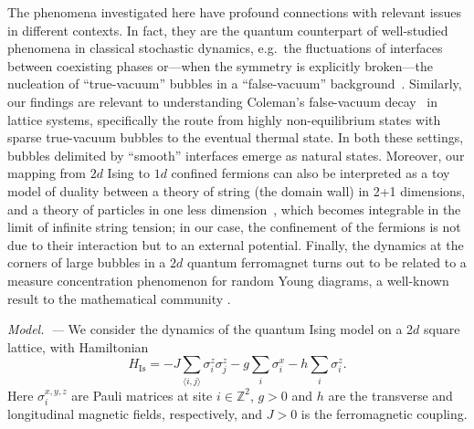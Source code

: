 \documentclass[reprint,aps,prl,superscriptaddress,english,nolongbibliography]{revtex4-2}
\begin{document}
The phenomena investigated here have profound connections with relevant issues in different contexts. In fact, they are the quantum counterpart of well-studied phenomena in classical stochastic dynamics, e.g.\ the fluctuations of interfaces between coexisting phases \cite{Krapivsky2004Dynamics,Krapivsky2012Limiting} or---when the symmetry is explicitly broken---the nucleation of ``true-vacuum'' bubbles in a ``false-vacuum'' background~\cite{bray1994theory,onuki2002phase}. Similarly, our findings are relevant to understanding Coleman's false-vacuum decay~\cite{Coleman1977False,coleman1988aspects,Rutkevich1999Decay,Lagnese2021False} in lattice systems, specifically the route from highly non-equilibrium states with sparse true-vacuum bubbles to the eventual thermal state. In both these settings, bubbles delimited by ``smooth'' interfaces emerge as natural states. Moreover, our mapping from $2d$ Ising to $1d$ confined fermions can also be interpreted as a toy model of duality between a theory of string (the domain wall) in 2+1 dimensions, and a theory of particles in one less dimension~\cite{maldacena1999large,gubser1998gauge,witten1998anti}, which becomes integrable in the limit of infinite string tension; in our case, the confinement of the fermions is not due to their interaction but to an external potential. Finally, the dynamics at the corners of large bubbles in a $2d$ quantum ferromagnet turns out to be related to a measure concentration phenomenon for random Young diagrams, a well-known result to the mathematical community \cite{Logan1977Variational,Vershik1977AsymPlancherel,Vershik1977AsymMaximal,Okounkov2000Random,Krapivsky2021Stochastic}.

\emph{Model.~---}
We consider the dynamics of the quantum Ising model on a 2$d$ square lattice, with Hamiltonian
\begin{equation}
    \label{eq:Ising2d_ham}
    H_{\mathrm{Is}} = -J\sum_{\langle i,j\rangle} \sigma_i^z \sigma_j^z - g \sum_i \sigma_i^x - h \sum_i \sigma_i^z.
\end{equation}
Here $\sigma_i^{x,y,z}$ are Pauli matrices at site $i\in\mathbb{Z}^2$, $g>0$ and $h$ are the transverse and longitudinal magnetic fields, respectively,  and $J>0$ is the ferromagnetic coupling.
\end{document}
